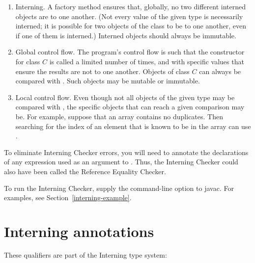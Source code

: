 \begin{enumerate}
\item
  Interning.  A factory method ensures that, globally, no two different
  interned objects are  to one another.
  (Not every value of the given type is necessarily interned; it is
  possible for two objects of the class to be
   to one another, even if one of them is interned.)
  Interned objects should always be immutable.
\item
  Global control flow.  The program's control flow is such that the
  constructor for class $C$ is called a limited number of times, and with
  specific values that ensure the results are not  to one
  another.  Objects of class $C$ can always be compared with \code{==}.
  Such objects may be mutable or immutable.
\item
  Local control flow.  Even though not all objects of the given type may be
  compared with \code{==}, the specific objects that can reach a given
  comparison may be.  For example, suppose that an array contains no
  duplicates.  Then searching for the index of an element that is
  known to be in the array can use \code{==}.
\end{enumerate}

To eliminate Interning Checker errors, you will need to annotate the
declarations of any expression used as an argument to \code{==}.
Thus, the Interning Checker
could also have been called the Reference Equality Checker.

\begin{sloppypar}
To run the Interning Checker, supply the
command-line option to javac.  For examples, see Section~\ref{interning-example}.
\end{sloppypar}


\section{Interning annotations\label{interning-annotations}}

These qualifiers are part of the Interning type system:

